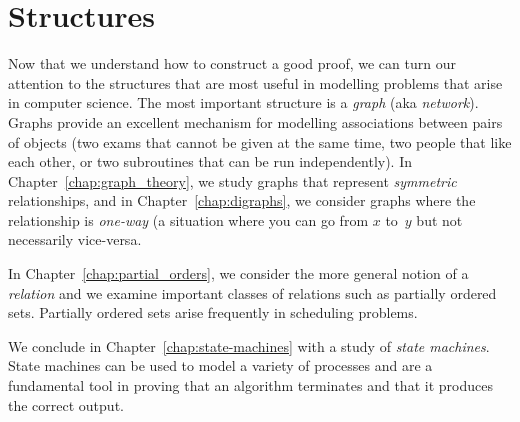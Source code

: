 \part{Structures}

Now that we understand how to construct a good proof, we can turn our
attention to the structures that are most useful in modelling problems
that arise in computer science.  The most important structure is a
\emph{graph} (aka \emph{network}).  Graphs provide an excellent
mechanism for modelling associations between pairs of objects (\eg two
exams that cannot be given at the same time, two people that like each
other, or two subroutines that can be run independently).  In
Chapter~\ref{chap:graph_theory}, we study graphs that represent
\emph{symmetric} relationships, and in Chapter~\ref{chap:digraphs}, we
consider graphs where the relationship is \emph{one-way} (\eg a
situation where you can go from $x$ to~$y$ but not necessarily
vice-versa.

In Chapter~\ref{chap:partial_orders}, we consider the more general
notion of a \emph{relation} and we examine important classes of
relations such as partially ordered sets.  Partially ordered sets
arise frequently in scheduling problems.

We conclude in Chapter~\ref{chap:state-machines} with a study of
\emph{state machines}.  State machines can be used to model a variety
of processes and are a fundamental tool in proving that an algorithm
terminates and that it produces the correct output.

\endinput
